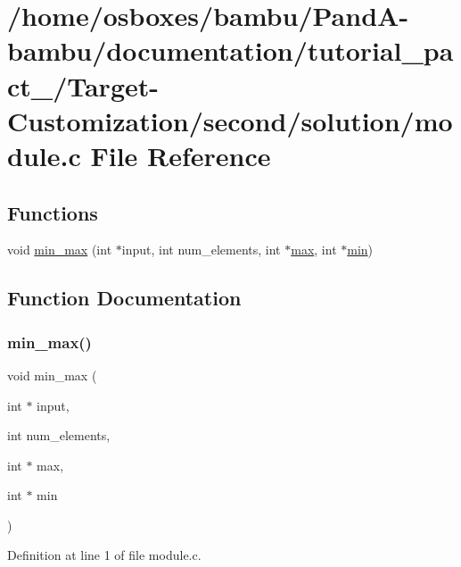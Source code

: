 \hypertarget{tutorial__pact__2019_2Target-Customization_2second_2solution_2module_8c}{}\section{/home/osboxes/bambu/\+Pand\+A-\/bambu/documentation/tutorial\+\_\+pact\+\_/\+Target-\/\+Customization/second/solution/module.c File Reference}
\label{tutorial__pact__2019_2Target-Customization_2second_2solution_2module_8c}
\subsection*{Functions}
\begin{DoxyCompactItemize}
\item 
void \hyperlink{tutorial__pact__2019_2Target-Customization_2second_2solution_2module_8c_ac07ce44426a0d2fb3786ace2dc125567}{min\+\_\+max} (int $\ast$input, int num\+\_\+elements, int $\ast$\hyperlink{tutorial__pact__2019_2Target-Customization_2first_2hint_8c_a28f422940797ea297699ba55d89171c5}{max}, int $\ast$\hyperlink{tutorial__pact__2019_2Introduction_2sixth_2qsort_8c_abb702d8b501669a23aa0ab3b281b9384}{min})
\end{DoxyCompactItemize}


\subsection{Function Documentation}
\mbox{\label{tutorial__pact__2019_2Target-Customization_2second_2solution_2module_8c_ac07ce44426a0d2fb3786ace2dc125567}} 
\subsubsection{\texorpdfstring{min\+\_\+max()}{min\_max()}}
{\footnotesize\ttfamily void min\+\_\+max (\begin{DoxyParamCaption}\item[{int $\ast$}]{input,  }\item[{int}]{num\+\_\+elements,  }\item[{int $\ast$}]{max,  }\item[{int $\ast$}]{min }\end{DoxyParamCaption})}



Definition at line 1 of file module.\+c.

